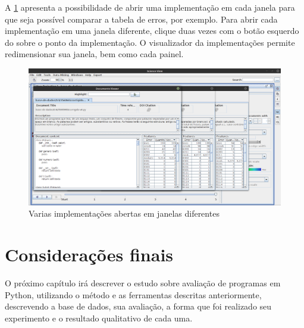 		A \cref{fig:ladoAlado} apresenta a possibilidade de abrir uma implementação em
		cada janela para que seja possível comparar a tabela de erros, por exemplo.
		Para abrir cada implementação em uma janela diferente, clique duas vezes com
		o botão esquerdo do  sobre o ponto da implementação. O
		visualizador da implementações permite redimensionar sua janela, bem como
		cada painel.
		
		\begin{figure}
			\centering
			\includegraphics[width=0.7\linewidth]{imagem/ladoAlado}
			\caption{Varias implementações abertas em janelas diferentes}
			\label{fig:ladoAlado}
		\end{figure}
		

	\section{Considerações finais}
	
		O próximo capítulo %
		irá descrever o estudo sobre avaliação de programas em Python,
		utilizando o método e as ferramentas descritas anteriormente,
		descrevendo a base de dados, sua avaliação, a forma que foi realizado
		seu experimento e o resultado qualitativo de cada uma.